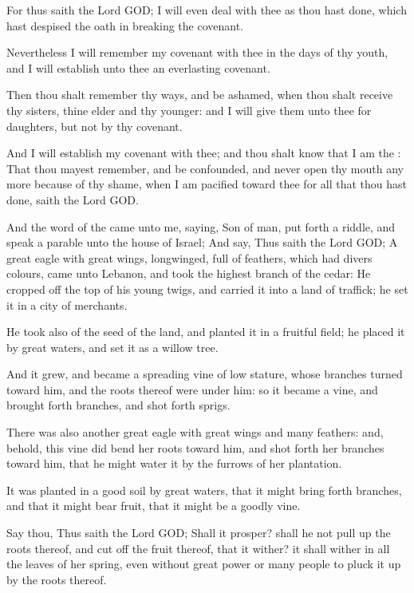 \Verse For thus saith the Lord GOD; I will even deal with thee as thou hast done, which hast despised the oath in breaking the covenant.

\Verse Nevertheless I will remember my covenant with thee in the days of thy youth, and I will establish unto thee an everlasting covenant.

\Verse Then thou shalt remember thy ways, and be ashamed, when thou shalt receive thy sisters, thine elder and thy younger: and I will give them unto thee for daughters, but not by thy covenant.

\Verse And I will establish my covenant with thee; and thou shalt know that I am the \LORD: \Verse That thou mayest remember, and be confounded, and never open thy mouth any more because of thy shame, when I am pacified toward thee for all that thou hast done, saith the Lord GOD.


\Chapter
\Verse And the word of the \LORD came unto me, saying, \Verse Son of man, put forth a riddle, and speak a parable unto the house of Israel; \Verse And say, Thus saith the Lord GOD; A great eagle with great wings, longwinged, full of feathers, which had divers colours, came unto Lebanon, and took the highest branch of the cedar: \Verse He cropped off the top of his young twigs, and carried it into a land of traffick; he set it in a city of merchants.

\Verse He took also of the seed of the land, and planted it in a fruitful field; he placed it by great waters, and set it as a willow tree.

\Verse And it grew, and became a spreading vine of low stature, whose branches turned toward him, and the roots thereof were under him: so it became a vine, and brought forth branches, and shot forth sprigs.

\Verse There was also another great eagle with great wings and many feathers: and, behold, this vine did bend her roots toward him, and shot forth her branches toward him, that he might water it by the furrows of her plantation.

\Verse It was planted in a good soil by great waters, that it might bring forth branches, and that it might bear fruit, that it might be a goodly vine.

\Verse Say thou, Thus saith the Lord GOD; Shall it prosper? shall he not pull up the roots thereof, and cut off the fruit thereof, that it wither? it shall wither in all the leaves of her spring, even without great power or many people to pluck it up by the roots thereof.


